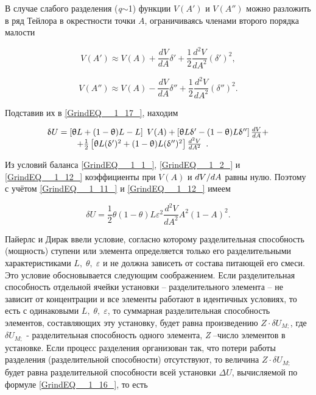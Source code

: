 В случае слабого разделения (\textit{q}$\mathrm{\sim}$1) функции $V(A')$ и $V(A'')$ можно разложить в ряд Тейлора в окрестности точки $A$, ограничиваясь членами второго порядка малости

\begin{equation} \label{GrindEQ__1_18_} 
V(A')\approx V(A)+\frac{dV}{dA} \delta '+\frac{1}{2} \frac{d^{2} V}{dA^{2}} (\delta ')^{2} ,        
\end{equation}

\begin{equation} \label{GrindEQ__1_19_} 
V(A'')\approx V(A)-\frac{dV}{dA} \delta ''+\frac{1}{2} \frac{d^{2} V}{dA^{2} } (\delta '')^{2} .     
\end{equation} 

Подставив их в \ref{GrindEQ__1_17_}, находим

\begin{equation} \label{GrindEQ__1_20_} 
\begin{array}{l} {\delta U=\left[\theta L+(1-\theta )L-L\right]{\kern 1pt} {\kern 1pt} {\kern 1pt} V(A)+\left[\theta L\delta '-(1-\theta )L\delta ''\right]\frac{dV}{dA} +} \\ {\, \, \, \, \, \, \, \, \, \, \, \, \, \, \, \, \, \, \, \, \, +\frac{1}{2} \left[\theta L(\delta ')^{2} +(1-\theta )L(\delta '')^{2} \right]\frac{d^{2} V}{dA^{2} } \, \, \, .} \end{array} 
\end{equation} 

Из условий баланса \ref{GrindEQ__1_1_}, \ref{GrindEQ__1_2_} и \ref{GrindEQ__1_12_} коэффициенты при $V(A)$ и ${dV \mathord{\left/{\vphantom{dV dA}}\right.\kern-\nulldelimiterspace} dA} $ равны нулю. Поэтому с учётом \ref{GrindEQ__1_11_} и \ref{GrindEQ__1_12_} имеем

\begin{equation} \label{GrindEQ__1_21_} 
\delta U=\frac{1}{2} \theta (1-\theta )L\varepsilon ^{2} \frac{d^{2} V}{dA^{2} } A^{2} (1-A)^{2} .           
\end{equation} 

Пайерлс и Дирак ввели условие, согласно которому разделительная способность (мощность) ступени или элемента определяется только его разделительными характеристиками $L,\; \theta ,\; \varepsilon $ и не должна зависеть от состава питающей его смеси. Это условие обосновывается следующим соображением. Если разделительная способность отдельной ячейки установки -- разделительного элемента -- не зависит от концентрации и все элементы работают в идентичных условиях, то есть с одинаковыми $L,\; \theta ,\; \varepsilon $, то суммарная разделительная способность элементов, составляющих эту установку, будет равна произведению $Z\cdot \delta U_{M;} $, где $\delta U_{M;} $ - разделительная способность одного элемента, \textit{Z} --число элементов в установке. Если процесс разделения организован так, что потери работы разделения (разделительной способности) отсутствуют, то величина $Z\cdot \delta U_{M;} $ будет равна разделительной способности всей установки $\Delta U$, вычисляемой по формуле \ref{GrindEQ__1_16_}, то есть

